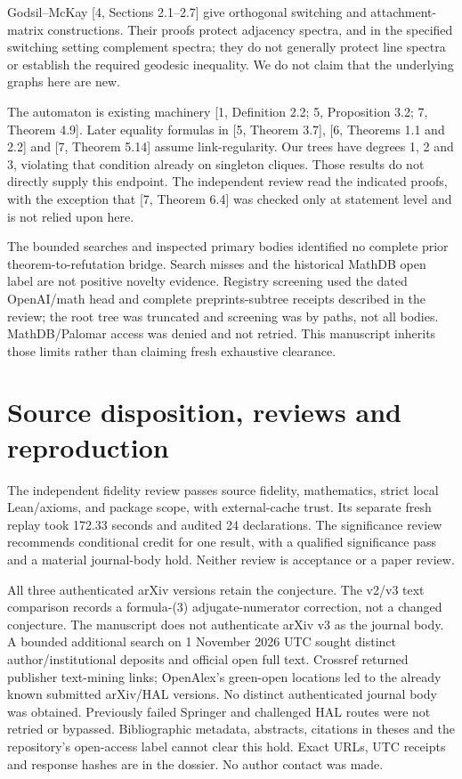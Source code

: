 \documentclass[11pt]{article}
\begin{document}
Godsil--McKay [4, Sections 2.1--2.7] give orthogonal switching and attachment-matrix constructions. Their proofs protect adjacency spectra, and in the specified switching setting complement spectra; they do not generally protect line spectra or establish the required geodesic inequality. We do not claim that the underlying graphs here are new.

The automaton is existing machinery [1, Definition 2.2; 5, Proposition 3.2; 7, Theorem 4.9]. Later equality formulas in [5, Theorem 3.7], [6, Theorems 1.1 and 2.2] and [7, Theorem 5.14] assume link-regularity. Our trees have degrees 1, 2 and 3, violating that condition already on singleton cliques. Those results do not directly supply this endpoint. The independent review read the indicated proofs, with the exception that [7, Theorem 6.4] was checked only at statement level and is not relied upon here.

The bounded searches and inspected primary bodies identified no complete prior theorem-to-refutation bridge. Search misses and the historical MathDB open label are not positive novelty evidence. Registry screening used the dated OpenAI/math head and complete preprints-subtree receipts described in the review; the root tree was truncated and screening was by paths, not all bodies. MathDB/Palomar access was denied and not retried. This manuscript inherits those limits rather than claiming fresh exhaustive clearance.
\newpage
\section{Source disposition, reviews and reproduction}
The independent fidelity review passes source fidelity, mathematics, strict local Lean/axioms, and package scope, with external-cache trust. Its separate fresh replay took 172.33 seconds and audited 24 declarations. The significance review recommends conditional credit for one result, with a qualified significance pass and a material journal-body hold. Neither review is acceptance or a paper review.

All three authenticated arXiv versions retain the conjecture. The v2/v3 text comparison records a formula-(3) adjugate-numerator correction, not a changed conjecture. The manuscript does not authenticate arXiv v3 as the journal body. A bounded additional search on 1 November 2026 UTC sought distinct author/institutional deposits and official open full text. Crossref returned publisher text-mining links; OpenAlex's green-open locations led to the already known submitted arXiv/HAL versions. No distinct authenticated journal body was obtained. Previously failed Springer and challenged HAL routes were not retried or bypassed. Bibliographic metadata, abstracts, citations in theses and the repository's open-access label cannot clear this hold. Exact URLs, UTC receipts and response hashes are in the dossier. No author contact was made.
\end{document}
